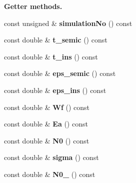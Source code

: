 \begin{Indent}{\bf Getter methods.}\par
\begin{DoxyCompactItemize}
\item 
\hypertarget{classParamList_a012be3a46bf086c10c0b8906b1c0ece1}{const unsigned \& {\bfseries simulation\-No} () const }\label{classParamList_a012be3a46bf086c10c0b8906b1c0ece1}

\item 
\hypertarget{classParamList_aaa4ab91dd1fb090f0d91a4c703e8c55a}{const double \& {\bfseries t\-\_\-semic} () const }\label{classParamList_aaa4ab91dd1fb090f0d91a4c703e8c55a}

\item 
\hypertarget{classParamList_a186672cc6a2eec77e726ab8337791822}{const double \& {\bfseries t\-\_\-ins} () const }\label{classParamList_a186672cc6a2eec77e726ab8337791822}

\item 
\hypertarget{classParamList_a4375bbd2e7ad0cede170a5ceb3f14bd0}{const double \& {\bfseries eps\-\_\-semic} () const }\label{classParamList_a4375bbd2e7ad0cede170a5ceb3f14bd0}

\item 
\hypertarget{classParamList_a26c5e5f7e2f9768a5dfb927ab2f27b0c}{const double \& {\bfseries eps\-\_\-ins} () const }\label{classParamList_a26c5e5f7e2f9768a5dfb927ab2f27b0c}

\item 
\hypertarget{classParamList_adcd107e7354e9fc5b74af7315fa7df80}{const double \& {\bfseries Wf} () const }\label{classParamList_adcd107e7354e9fc5b74af7315fa7df80}

\item 
\hypertarget{classParamList_a7bb2ca3a9d5d0c39b2236a9bcb3e0815}{const double \& {\bfseries Ea} () const }\label{classParamList_a7bb2ca3a9d5d0c39b2236a9bcb3e0815}

\item 
\hypertarget{classParamList_a208a97deee7c9c07aa4a24563c116b43}{const double \& {\bfseries N0} () const }\label{classParamList_a208a97deee7c9c07aa4a24563c116b43}

\item 
\hypertarget{classParamList_aeab76c5d57194aecd33538540db7c42f}{const double \& {\bfseries sigma} () const }\label{classParamList_aeab76c5d57194aecd33538540db7c42f}

\item 
\hypertarget{classParamList_af17ca56cc73a7ebadb577308bd5b7ad6}{const double \& {\bfseries N0\-\_} () const }\label{classParamList_af17ca56cc73a7ebadb577308bd5b7ad6}


\end{DoxyCompactItemize}
\end{Indent}
